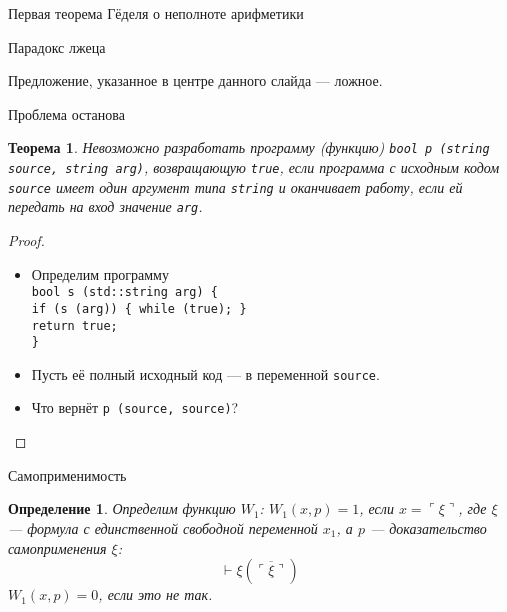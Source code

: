 \documentclass[aspectratio=169]{beamer}
\newtheorem{thm}{Теорема}[section]
\newtheorem{dfn}{Определение}[section]
\begin{document}
\begin{frame}{}
\begin{center}\LARGE Первая теорема Гёделя о неполноте арифметики\end{center}
\end{frame}

\begin{frame}{Парадокс лжеца}
\begin{center}Предложение, указанное в центре данного слайда --- ложное.\end{center}
\end{frame}

\begin{frame}{Проблема останова}
\begin{thm}Невозможно разработать программу (функцию) \texttt{bool p (string source, string arg)},
возвращающую \texttt{true}, если программа с исходным кодом \texttt{source} имеет один аргумент
типа \texttt{string} и оканчивает работу, если ей передать на вход значение \texttt{arg}. 
\end{thm}

\begin{proof}
\begin{itemize}
\item Определим программу \\\texttt{bool s (std::string arg) \{\\
\hspace{1cm}if (s (arg)) \{ while (true); \}\\
\hspace{1cm}return true;\\
\}}
\item Пусть её полный исходный код --- в переменной \texttt{source}. 
\item Что вернёт \texttt{p (source, source)}?
\end{itemize}
\end{proof}
\end{frame}

\begin{frame}{Самоприменимость}
\begin{dfn}Определим функцию $W_1$:
$W_1(x,p)=1$, если
$x = \ulcorner \xi \urcorner$, где $\xi$ --- формула с единственной свободной
переменной $x_1$, а $p$ --- доказательство самоприменения $\xi$:
$$\vdash \xi(\overline{\ulcorner \xi \urcorner})$$
$W_1(x,p)=0$, если это не так.
\end{dfn}
\end{frame}
\end{document}
